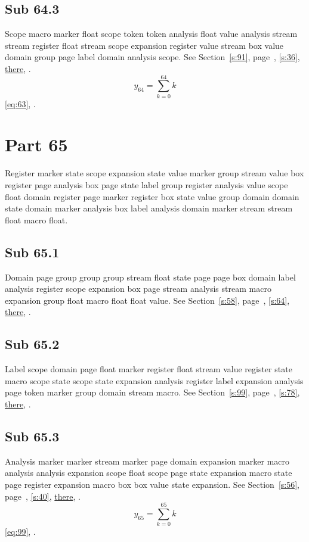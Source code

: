 \documentclass[11pt]{article}
\begin{document}
\subsection{Sub 64.3}\label{ss:64.3} Scope macro marker float scope token token analysis float value analysis stream stream register float stream scope expansion register value stream box value domain group page label domain analysis scope. See Section~\ref{s:91}, page~\pageref{ss:45.3}, \cref{s:36}, \hyperref[s:65]{there}, \cite{k84,k60}.
\begin{equation}y_{64}=\sum_{k=0}^{64}k\label{eq:64}\end{equation} \eqref{eq:63}, .
\section{Part 65}\label{s:65}
Register marker state scope expansion state value marker group stream value box register page analysis box page state label group register analysis value scope float domain register page marker register box state value group domain domain state domain marker analysis box label analysis domain marker stream stream float macro float.
\subsection{Sub 65.1}\label{ss:65.1} Domain page group group group stream float state page page box domain label analysis register scope expansion box page stream analysis stream macro expansion group float macro float float value. See Section~\ref{s:58}, page~\pageref{ss:78.3}, \cref{s:64}, \hyperref[s:62]{there}, \cite{k73,k62}.
\subsection{Sub 65.2}\label{ss:65.2} Label scope domain page float marker register float stream value register state macro scope state scope state expansion analysis register label expansion analysis page token marker group domain stream macro. See Section~\ref{s:99}, page~\pageref{ss:60.3}, \cref{s:78}, \hyperref[s:87]{there}, \cite{k69,k111}.
\subsection{Sub 65.3}\label{ss:65.3} Analysis marker marker stream marker page domain expansion marker macro analysis analysis expansion scope float scope page state expansion macro state page register expansion macro box box value state expansion. See Section~\ref{s:56}, page~\pageref{ss:79.3}, \cref{s:40}, \hyperref[s:85]{there}, \cite{k96,k108}.
\begin{equation}y_{65}=\sum_{k=0}^{65}k\label{eq:65}\end{equation} \eqref{eq:99}, .
\end{document}
